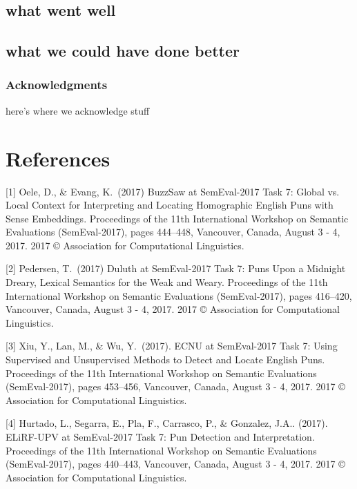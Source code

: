 \documentclass{article}
\begin{document}
\subsection{what went well}
\subsection{what we could have done better}

\subsubsection*{Acknowledgments}

here's where we acknowledge stuff

\section*{References}

\medskip

\small

[1] Oele, D., \& Evang, K.\ (2017) BuzzSaw at SemEval-2017 Task 7:
Global vs. Local Context for Interpreting and Locating Homographic English Puns
with Sense Embeddings. Proceedings of the 11th International Workshop on
Semantic Evaluations (SemEval-2017), pages 444–448, Vancouver, Canada, August 3
- 4, 2017. 2017 © Association for Computational Linguistics.

[2] Pedersen, T.\ (2017) Duluth at SemEval-2017 Task 7: Puns Upon a Midnight
Dreary, Lexical Semantics for the Weak and Weary. Proceedings of the 11th
International Workshop on Semantic Evaluations (SemEval-2017), pages 416–420,
Vancouver, Canada, August 3 - 4, 2017. 2017 © Association for Computational
Linguistics.

[3] Xiu, Y., Lan, M., \& Wu, Y.\ (2017). ECNU at SemEval-2017 Task 7: Using
Supervised and Unsupervised Methods to Detect and Locate English Puns.
Proceedings of the 11th International Workshop on Semantic Evaluations
(SemEval-2017), pages 453–456, Vancouver, Canada, August 3 - 4, 2017. 2017 ©
Association for Computational Linguistics.

[4] Hurtado, L., Segarra, E., Pla, F., Carrasco, P., \& Gonzalez, J.A..
(2017). ELiRF-UPV at SemEval-2017 Task 7: Pun Detection and Interpretation.
Proceedings of the 11th International Workshop on Semantic Evaluations
(SemEval-2017), pages 440–443, Vancouver, Canada, August 3 - 4,
2017. 2017 © Association for Computational Linguistics.
\end{document}
